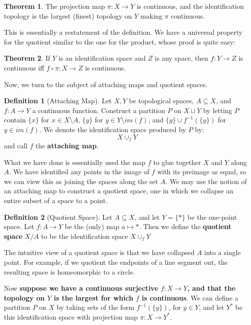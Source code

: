 \documentclass[11pt, oneside]{amsart}   	%
\theoremstyle{definition}
\newtheorem{definition}{Definition}[section]
\newtheorem{theorem}{Theorem}[section]
\begin{document}
	\begin{theorem}
		The projection map $\pi : X\rightarrow Y$ is continuous, and the identification topology is the largest (finest) topology on $Y$ making $\pi$ continuous.
	\end{theorem}
	
	This is essentially a restatement of the definition. We have a universal property for the quotient similar to the one for the product, whose proof is quite 
	easy:
	
	\begin{theorem}
		If $Y$ is an identification space and $Z$ is any space, then $f : Y\rightarrow Z$ is continuous iff $f\circ\pi : X\rightarrow Z$ is continuous. 
	\end{theorem}
	
	Now, we turn to the subject of attaching maps and quotient spaces. 
	
	\begin{definition}[Attaching Map]
		Let $X, Y$ be topological spaces, $A\subseteq X$, and $f : A\rightarrow Y$ a continuous function. Construct a partition $P$ on $X\sqcup Y$ by 
		letting $P$ contain $\{x\}$ for $x\in X\setminus A$, $\{y\}$ for $y\in Y\setminus im(f)$, and $\{y\}\cup f^{-1}(\{y\})$ for $y\in im(f)$. We denote the 
		identification space produced by $P$ by:
		$$
			X\cup_f Y
		$$
		and call $f$ the \textbf{attaching map}.
	\end{definition}
	
	What we have done is essentially used the map $f$ to glue together $X$ and $Y$ along $A$. We have identified any points in the image of $f$ with its 
	preimage as equal, so we can view this as joining the spaces along the set $A$. We may use the notion of an attaching map to construct a quotient space, 
	one in which we collapse an entire subset of a space to a point.
	
	\begin{definition}[Quotient Space]
		Let $A\subseteq X$, and let $Y = \{*\}$ be the one-point space. Let $f : A\rightarrow Y$ be the (only) map $a\mapsto *$. Then we define the 
		\textbf{quotient space} $X / A$ to be the identification space $X\cup_f Y$
	\end{definition}
	
	The intuitive view of a quotient space is that we have collapsed $A$ into a single point. For example, if we quotient the endpoints of a line segment out, 
	the resulting space is homeomorphic to a circle. 
	
	Now \textbf{suppose we have a continuous surjective $f : X\rightarrow Y$, and that the topology on $Y$ is the largest for which $f$ is continuous}. We can 
	define a partition $P$ on $X$ by taking sets of the form $f^{-1}(\{y\})$, for $y\in Y$, and let $Y^*$ be this identification space with projection map $\pi : X
	\rightarrow Y^*$. 
	
\end{document}
